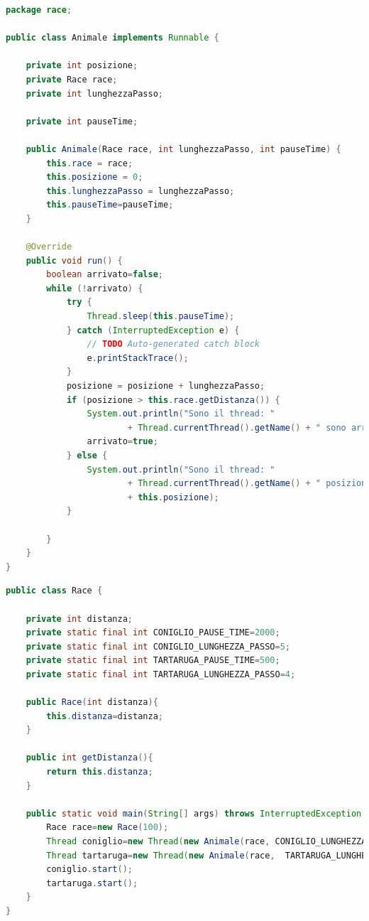 \documentclass{article}
\begin{document}
\begin{lstlisting}[language=Java]
package race;

public class Animale implements Runnable {

	private int posizione;
	private Race race;
	private int lunghezzaPasso;
	
	private int pauseTime;

	public Animale(Race race, int lunghezzaPasso, int pauseTime) {
		this.race = race;
		this.posizione = 0;
		this.lunghezzaPasso = lunghezzaPasso;
		this.pauseTime=pauseTime;
	}

	@Override
	public void run() {
		boolean arrivato=false;
		while (!arrivato) {
			try {
				Thread.sleep(this.pauseTime);
			} catch (InterruptedException e) {
				// TODO Auto-generated catch block
				e.printStackTrace();
			}
			posizione = posizione + lunghezzaPasso;
			if (posizione > this.race.getDistanza()) {
				System.out.println("Sono il thread: "
						+ Thread.currentThread().getName() + " sono arrivato");
				arrivato=true;
			} else {
				System.out.println("Sono il thread: "
						+ Thread.currentThread().getName() + " posizione "
						+ this.posizione);
			}

		}
	}
}
\end{lstlisting}

\begin{lstlisting}[language=Java]
public class Race {
	
	private int distanza;
	private static final int CONIGLIO_PAUSE_TIME=2000;
	private static final int CONIGLIO_LUNGHEZZA_PASSO=5;
	private static final int TARTARUGA_PAUSE_TIME=500;
	private static final int TARTARUGA_LUNGHEZZA_PASSO=4;
	
	public Race(int distanza){
		this.distanza=distanza;
	}
	
	public int getDistanza(){
		return this.distanza;
	}
	
	public static void main(String[] args) throws InterruptedException {
		Race race=new Race(100);
		Thread coniglio=new Thread(new Animale(race, CONIGLIO_LUNGHEZZA_PASSO, CONIGLIO_PAUSE_TIME), "CONIGLIO");
		Thread tartaruga=new Thread(new Animale(race,  TARTARUGA_LUNGHEZZA_PASSO, TARTARUGA_LUNGHEZZA_PASSO), "TARTARUGA");
		coniglio.start();
		tartaruga.start();
	}
}
\end{lstlisting}
\end{document}
